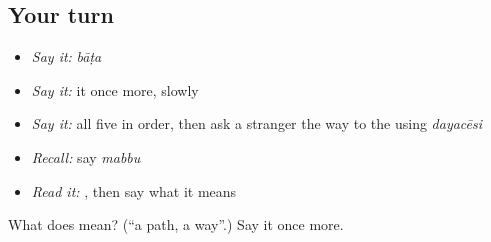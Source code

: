 \subsection*{Your turn}
\begin{itemize}
\raggedright
  \item \emph{Say it:} \emph{bāṭa}
  \item \emph{Say it:} it once more, slowly
  \item \emph{Say it:} all five in order, then ask a stranger the way to the  using \emph{dayacēsi}
  \item \emph{Recall:} say \emph{mabbu}
  \item \emph{Read it:} \textbf{}, then say what it means
\end{itemize}

\begin{tcolorbox}[breakable,colback=teal!4,colframe=teal!35!black,title={Before you move on}]
What does  mean? (\textquotedblleft{}a path, a way\textquotedblright{}.) Say it once more.
\end{tcolorbox}
